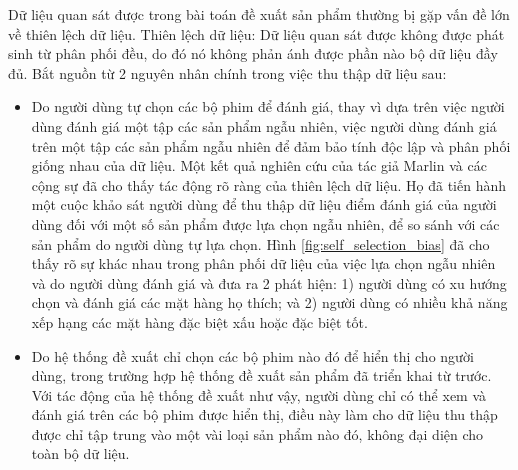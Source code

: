 Dữ liệu quan sát được trong bài toán đề xuất sản phẩm thường bị gặp vấn đề lớn về thiên lệch dữ liệu. Thiên lệch dữ liệu: Dữ liệu quan sát được không được phát sinh từ phân phối đều, do đó nó không phản ánh được phần nào bộ dữ liệu đầy đủ. Bắt nguồn từ 2 nguyên nhân chính trong việc thu thập dữ liệu sau:
\begin{itemize}
    \item Do người dùng tự chọn các bộ phim để đánh giá, thay vì dựa trên việc người dùng đánh giá một tập các sản phẩm ngẫu nhiên, việc người dùng đánh giá trên một tập các sản phẩm ngẫu nhiên để đảm bảo tính độc lập và phân phối giống nhau của dữ liệu.
    Một kết quả nghiên cứu của tác giả Marlin và các cộng sự \cite{bias} đã cho thấy tác động rõ ràng của thiên lệch dữ liệu. Họ đã tiến hành một cuộc khảo sát người dùng để thu thập dữ liệu điểm đánh giá của người dùng đối với một số sản phẩm được lựa chọn ngẫu nhiên, để so sánh với các sản phẩm do người dùng tự lựa chọn. Hình \ref{fig:self_selection_bias} đã cho thấy rõ sự khác nhau trong phân phối dữ liệu của việc lựa chọn ngẫu nhiên và do người dùng đánh giá và đưa ra 2 phát hiện: 1) người dùng có xu hướng chọn và đánh giá các mặt hàng họ thích; và 2) người dùng có nhiều khả năng xếp hạng các mặt hàng đặc biệt xấu hoặc đặc biệt tốt.
    \item Do hệ thống đề xuất chỉ chọn các bộ phim nào đó để hiển thị cho người dùng, trong trường hợp hệ thống đề xuất sản phẩm đã triển khai từ trước. Với tác động của hệ thống đề xuất như vậy, người dùng chỉ có thể xem và đánh giá trên các bộ phim được hiển thị, điều này làm cho dữ liệu thu thập được chỉ tập trung vào một vài loại sản phẩm nào đó, không đại diện cho toàn bộ dữ liệu.
\end{itemize}

